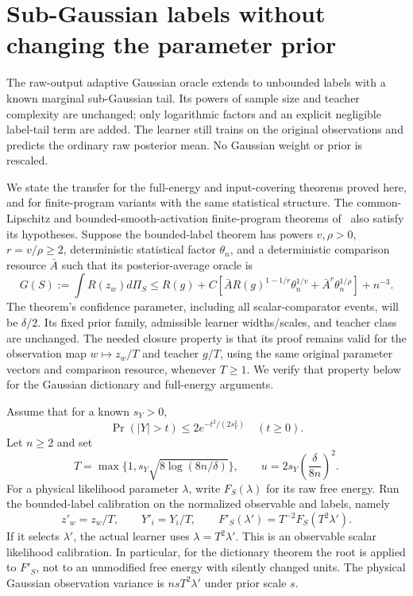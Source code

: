 \section{Sub-Gaussian labels without changing the parameter prior}
\label{sec:subgaussian-adaptive-transfer}
The raw-output adaptive Gaussian oracle extends to unbounded labels with a known marginal sub-Gaussian tail. Its powers of sample size and teacher complexity are unchanged; only logarithmic factors and an explicit negligible label-tail term are added. The learner still trains on the original observations and predicts the ordinary raw posterior mean. No Gaussian weight or prior is rescaled.

We state the transfer for the full-energy and input-covering theorems proved here, and for finite-program variants with the same statistical structure. The common-Lipschitz and bounded-smooth-activation finite-program theorems of~\cite{common-program,smooth-program} also satisfy its hypotheses. Suppose the bounded-label theorem has powers $v,\rho>0$, $r=v/\rho\ge2$, deterministic statistical factor $\theta_n$, and a deterministic comparison resource $\bar A$ such that its posterior-average oracle is
\begin{equation}
 G(S):=\int R(z_w)d\Pi_S
 \le R(g)+C\left[
 \bar A R(g)^{1-1/r}\theta_n^{1/v}
          +\bar A^r\theta_n^{1/\rho}\right]+n^{-3}.
 \label{eq:transfer-unit-oracle}
\end{equation}
The theorem's confidence parameter, including all scalar-comparator events, will be $\delta/2$. Its fixed prior family, admissible learner widths/scales, and teacher class are unchanged. The needed closure property is that its proof remains valid for the observation map $w\mapsto z_w/T$ and teacher $g/T$, using the same original parameter vectors and comparison resource, whenever $T\ge1$. We verify that property below for the Gaussian dictionary and full-energy arguments.

Assume that for a known $s_Y>0$,
\begin{equation}
 \Pr(|Y|>t)\le2e^{-t^2/(2s_Y^2)}\quad(t\ge0).
 \label{eq:transfer-label-tail}
\end{equation}
Let $n\ge2$ and set
\begin{equation}
 T=\max\{1,s_Y\sqrt{8\log(8n/\delta)}\},
 \qquad u=2s_Y\left(\frac\delta{8n}\right)^2.
 \label{eq:transfer-T}
\end{equation}
For a physical likelihood parameter $\lambda$, write $F_S(\lambda)$ for its raw free energy. Run the bounded-label calibration on the normalized observable and labels, namely
\[
 z'_w=z_w/T,\qquad Y'_i=Y_i/T,
 \qquad F'_S(\lambda')=T^{-2}F_S(T^2\lambda').
\]
If it selects $\lambda'$, the actual learner uses $\lambda=T^2\lambda'$. This is an observable scalar likelihood calibration. In particular, for the dictionary theorem the root is applied to $F'_S$, not to an unmodified free energy with silently changed units. The physical Gaussian observation variance is $nsT^2\lambda'$ under prior scale $s$.

